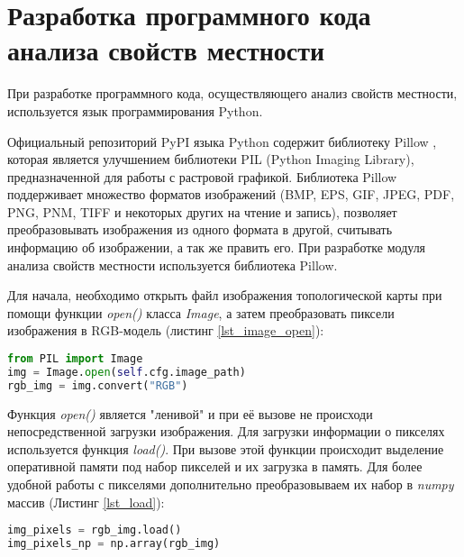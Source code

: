 \section{Разработка программного кода анализа свойств местности}

При разработке программного кода, осуществляющего анализ свойств местности, используется язык программирования Python. 

Официальный репозиторий PyPI языка Python содержит библиотеку Pillow \cite{pillow}, которая является улучшением 
библиотеки PIL (Python Imaging Library), предназначенной для работы с растровой графикой. Библиотека Pillow 
поддерживает множество форматов изображений (BMP, EPS, GIF, JPEG, PDF, PNG, PNM, TIFF и некоторых других на чтение и 
запись), позволяет преобразовывать изображения из одного формата в другой, считывать информацию об изображении, а так 
же править его. При разработке модуля анализа свойств местности используется библиотека Pillow.

Для начала, необходимо открыть файл изображения топологической карты при помощи функции \textit{open()} класса 
\textit{Image}, а затем преобразовать пиксели изображения в RGB-модель (листинг \ref{lst_image_open}):

\begin{lstlisting}[caption=Открытие изображения топологической карты, label={lst_image_open},language=Python]
from PIL import Image
img = Image.open(self.cfg.image_path)
rgb_img = img.convert("RGB")
\end{lstlisting}

Функция \textit{open()} является "ленивой" и при её вызове не происходи непосредственной загрузки изображения. Для 
загрузки информации о пикселях используется функция \textit{load()}. При вызове этой функции происходит выделение 
оперативной памяти под набор пикселей и их загрузка в память. Для более удобной работы с пикселями дополнительно 
преобразовываем их набор в \textit{numpy} массив (Листинг \ref{lst_load}):

\begin{lstlisting}[caption=Загрузка информации о пикселях изображения, label={lst_load},language=Python]
img_pixels = rgb_img.load()
img_pixels_np = np.array(rgb_img)
\end{lstlisting}
